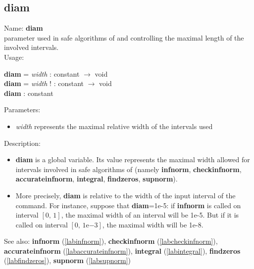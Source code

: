 \subsection{diam}
\label{labdiam}
\noindent Name: \textbf{diam}\\
parameter used in safe algorithms of \sollya and controlling the maximal length of the involved intervals.\\
\noindent Usage: 
\begin{center}
\textbf{diam} = \emph{width} : \textsf{constant} $\rightarrow$ \textsf{void}\\
\textbf{diam} = \emph{width} ! : \textsf{constant} $\rightarrow$ \textsf{void}\\
\textbf{diam} : \textsf{constant}\\
\end{center}
Parameters: 
\begin{itemize}
\item \emph{width} represents the maximal relative width of the intervals used
\end{itemize}
\noindent Description: \begin{itemize}

\item \textbf{diam} is a global variable. Its value represents the maximal width allowed
   for intervals involved in safe algorithms of \sollya (namely \textbf{infnorm},
   \textbf{checkinfnorm}, \textbf{accurateinfnorm}, \textbf{integral}, \textbf{findzeros}, \textbf{supnorm}).

\item More precisely, \textbf{diam} is relative to the width of the input interval of
   the command. For instance, suppose that \textbf{diam}=1e-5: if \textbf{infnorm} is called
   on interval $[0,\,1]$, the maximal width of an interval will be 1e-5. But if it
   is called on interval $[0,\,1\mathrm{e}{-3}]$, the maximal width will be 1e-8.
\end{itemize}
See also: \textbf{infnorm} (\ref{labinfnorm}), \textbf{checkinfnorm} (\ref{labcheckinfnorm}), \textbf{accurateinfnorm} (\ref{labaccurateinfnorm}), \textbf{integral} (\ref{labintegral}), \textbf{findzeros} (\ref{labfindzeros}), \textbf{supnorm} (\ref{labsupnorm})
